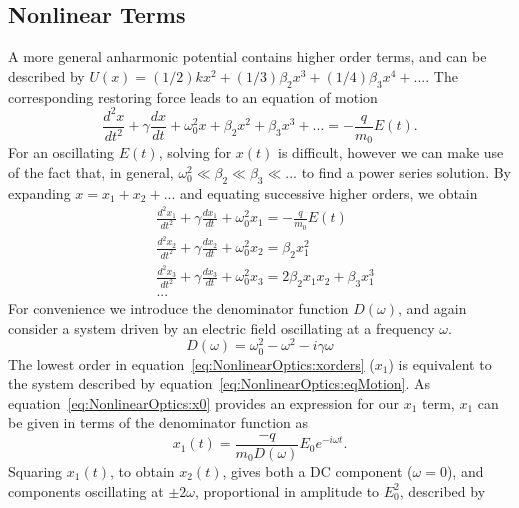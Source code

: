 \subsection{Nonlinear Terms}
A more general anharmonic potential contains higher order terms, and can be described by $U(x) = (1/2)kx^{2} + (1/3)\beta_2 x^3 + (1/4)\beta_3 x^4 + ...$. The corresponding restoring force leads to an equation of motion
\begin{equation}\label{eq:NonlinearOptics:eqMotionNonlinear}
	\frac{d^2 x}{dt^2} + \gamma \frac{dx}{dt} + \omega_{0}^2 x + \beta_2 x^2 +  \beta_3 x^3 + ... = -\frac{q}{m_{0} } E(t).
\end{equation}
For an oscillating $E(t)$, solving for $x(t)$ is difficult, however we can make use of the fact that, in general, $\omega_{0}^2 \ll \beta_2 \ll \beta_3 \ll ...$ to find a power series solution. By expanding $x = x_1 + x_2 + ...$ and equating successive higher orders, we obtain~\cite[\S 1.4.1]{Boyd2008a}
\begin{equation}\label{eq:NonlinearOptics:xorders}
	\begin{split}
		& \frac{d^2 x_1}{dt^2} + \gamma \frac{dx_1}{dt} + \omega_{0}^2 x_1 = -\frac{q}{m_{0} } E(t) \\
		& \frac{d^2 x_2}{dt^2} + \gamma \frac{dx_2}{dt} + \omega_{0}^2 x_2 = \beta_2 x_1^2 \\
		& \frac{d^2 x_3}{dt^2} + \gamma \frac{dx_3}{dt} + \omega_{0}^2 x_3 = 2\beta_2 x_1 x_2 + \beta_3 x_1^3 \\
		& ...
	\end{split}
\end{equation}
For convenience we introduce the denominator function $D(\omega)$, and again consider a system driven by an electric field oscillating at a frequency $\omega$.
\begin{equation}
	D(\omega) = \omega_{0}^2 -\omega^2 -i \gamma \omega
\end{equation}
The lowest order in equation~\ref{eq:NonlinearOptics:xorders} ($x_{1}$) is equivalent to the system described by equation~\ref{eq:NonlinearOptics:eqMotion}. As equation~\ref{eq:NonlinearOptics:x0} provides an expression for our $x_1$ term, $x_1$ can be given in terms of the denominator function as
\begin{equation}
	x_{1}(t) = \frac{-q}{m_0 D(\omega)} E_0 e^{-i\omega t}.
\end{equation}
Squaring $x_{1}(t)$, to obtain $x_{2}(t)$, gives both a DC component ($\omega=0$), and components oscillating at $\pm 2\omega$, proportional in amplitude to $E_{0}^2$, described by
